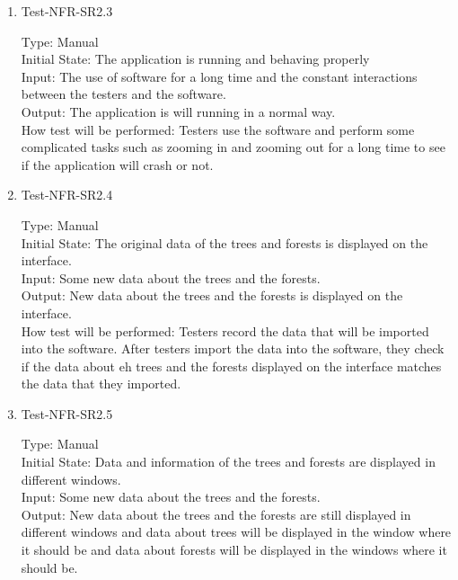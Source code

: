 \documentclass[12pt, titlepage]{article}
\begin{document}
\begin{enumerate}
\item{Test-NFR-SR2.3\\}

Type: Manual\\

Initial State: The application is running and behaving properly\\

Input: The use of software for a long time and the constant interactions between the testers and the software.\\

Output: The application is will running in a normal way.\\

How test will be performed: Testers use the software and perform some complicated tasks such as zooming in and zooming out for a long time to see if the application will crash or not.

\item{Test-NFR-SR2.4\\}

Type: Manual\\

Initial State: The original data of the trees and forests is displayed on the interface.\\

Input: Some new data about the trees and the forests.\\

Output: New data about the trees and the forests is displayed on the interface.\\

How test will be performed: Testers record the data that will be imported into the software. After testers import the data into the software, they check if the data about eh trees and the forests displayed on the interface matches the data that they imported.

\item{Test-NFR-SR2.5\\}

Type: Manual\\

Initial State: Data and information of the trees and forests are displayed in different windows.\\

Input: Some new data about the trees and the forests.\\

Output: New data about the trees and the forests are still displayed in different windows and data about trees will be displayed in the window where it should be and data about forests will be displayed in the windows where it should be.\\


\end{enumerate}
\end{document}
